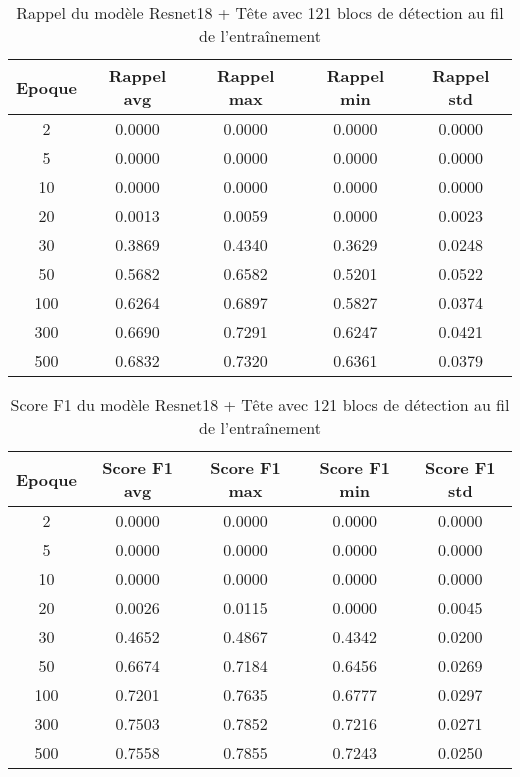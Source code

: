 \begin{table}[!ht]
    \caption{Rappel du modèle Resnet18 + Tête avec 121 blocs de détection au fil de l'entraînement}
    \label{tab:resnet18+head_121n_rappel}
    \centering
    \begin{tabular}{ |c||c|c|c|c|  }
        \hline
        \rowcolor{gray!50}
        Epoque & Rappel avg & Rappel max & Rappel min & Rappel std\\
        \hline
        2 & 0.0000 & 0.0000 & 0.0000 & 0.0000\\
        5 & 0.0000 & 0.0000 & 0.0000 & 0.0000\\
        10 & 0.0000 & 0.0000 & 0.0000 & 0.0000\\
        20 & 0.0013 & 0.0059 & 0.0000 & 0.0023\\
        30 & 0.3869 & 0.4340 & 0.3629 & 0.0248\\
        50 & 0.5682 & 0.6582 & 0.5201 & 0.0522\\
        100 & 0.6264 & 0.6897 & 0.5827 & 0.0374\\
        300 & 0.6690 & 0.7291 & 0.6247 & 0.0421\\
        500 & 0.6832 & 0.7320 & 0.6361 & 0.0379\\
        \hline
    \end{tabular}
\end{table}

\begin{table}[!ht]
    \caption{Score F1 du modèle Resnet18 + Tête avec 121 blocs de détection au fil de l'entraînement}
    \label{tab:resnet18+head_121n_f1score}
    \centering
    \begin{tabular}{ |c||c|c|c|c|  }
        \hline
        \rowcolor{gray!50}
        Epoque & Score F1 avg & Score F1 max & Score F1 min & Score F1 std\\
        \hline
        2 & 0.0000 & 0.0000 & 0.0000 & 0.0000\\
        5 & 0.0000 & 0.0000 & 0.0000 & 0.0000\\
        10 & 0.0000 & 0.0000 & 0.0000 & 0.0000\\
        20 & 0.0026 & 0.0115 & 0.0000 & 0.0045\\
        30 & 0.4652 & 0.4867 & 0.4342 & 0.0200\\
        50 & 0.6674 & 0.7184 & 0.6456 & 0.0269\\
        100 & 0.7201 & 0.7635 & 0.6777 & 0.0297\\
        300 & 0.7503 & 0.7852 & 0.7216 & 0.0271\\
        500 & 0.7558 & 0.7855 & 0.7243 & 0.0250\\
        \hline
    \end{tabular}
\end{table}

